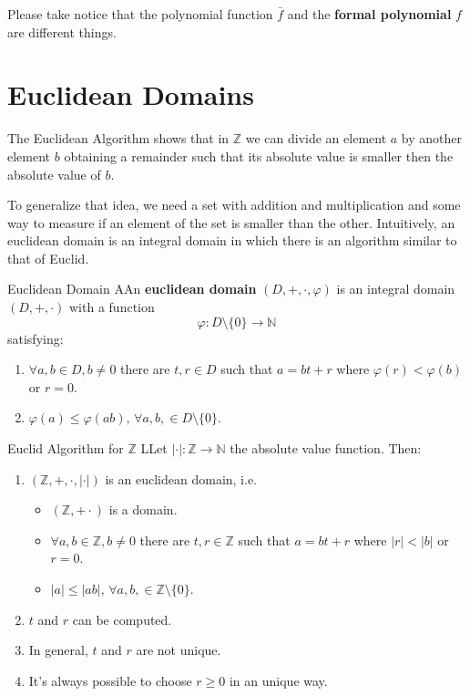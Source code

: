 \documentclass[12pt,a4paper]{article}
\begin{document}
Please take notice that the polynomial function $\bar{f}$ and the \textbf{formal polynomial} $f$ are different things.

\section{Euclidean Domains}

The Euclidean Algorithm shows that in $\mathbb{Z}$ we can divide an element $a$ by another element $b$ obtaining a remainder such that its absolute value is smaller then the absolute value of $b$. 

To generalize that idea, we need a set with addition and multiplication and some way to measure if an element of the set is smaller than the other. Intuitively, an euclidean domain is an integral domain in which there is an algorithm similar to that of Euclid.

\begin{defn}{Euclidean Domain}
AAn \textbf{euclidean domain} $(D, +, \cdot, \varphi)$ is an integral domain $(D,+,\cdot)$ with a function
\[
\varphi : D \setminus \{0 \} \to \mathbb{N}
\]
satisfying:
\begin{enumerate}
\item $\forall a,b \in D, b \neq 0$ there are $t, r \in D$ such that $a = bt+r$ where $\varphi(r) < \varphi(b)$ or $r = 0$.
\item $\varphi(a) \leq \varphi(ab), \, \forall a,b, \in D \setminus \{0\}$.
\end{enumerate}
\end{defn}

\begin{thm}{Euclid Algorithm for $\mathbb{Z}$}
LLet $ | \cdot | :  \mathbb{Z} \to \mathbb{N} $ the absolute value function. Then:
\begin{enumerate}
\item $(\mathbb{Z}, +, \cdot, | \cdot |)$ is an euclidean domain, i.e.
\begin{itemize}
\item $(\mathbb{Z}, + \cdot)$ is a domain.
\item $\forall a,b \in \mathbb{Z}, b \neq 0$ there are $t, r \in \mathbb{Z}$ such that $a = bt+r$ where $|r| < |b|$ or $r = 0$.
\item $|a| \leq |ab|, \, \forall a,b, \in \mathbb{Z} \setminus \{0\}$.
\end{itemize}
\item $t$ and $r$ can be computed.
\item In general, $t$ and $r$ are not unique.
\item It's always possible to choose $r \geq 0$ in an unique way.
\end{enumerate}
\end{thm}
\end{document}

